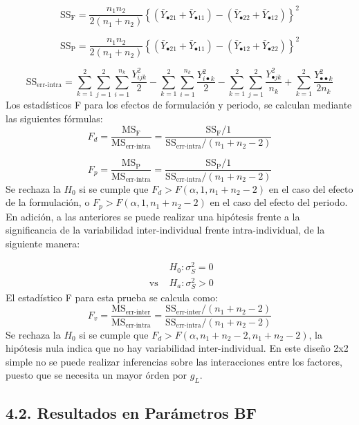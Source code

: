 \documentclass[]{article}
\begin{document}
\[
\textrm{SS}_{\textrm{F}}= 
\frac{n_{1}n_{2}}{2\left(n_{1}+n_{2}\right)} 
\left\{
\left(\bar{Y}_{\bullet 21}+\bar{Y}_{\bullet 11}\right)-
\left(\bar{Y}_{\bullet 22}+\bar{Y}_{\bullet 12}\right)
\right\}^{2}
\]

\[
\textrm{SS}_{\textrm{P}}= 
\frac{n_{1}n_{2}}{2\left(n_{1}+n_{2}\right)} 
\left\{
\left(\bar{Y}_{\bullet 21}+\bar{Y}_{\bullet 11}\right)-
\left(\bar{Y}_{\bullet 12}+\bar{Y}_{\bullet 22}\right)
\right\}^{2}
\]

\[
\textrm{SS}_{\textrm{err-intra}}=
\sum_{k=1}^{2}\sum_{j=1}^{2}\sum_{i=1}^{n_{k}}{\frac{Y_{ijk}^{2}}{2}}-
\sum_{k=1}^{2}\sum_{i=1}^{n_{k}}{\frac{Y_{i\bullet k}^{2}}{2}}-
\sum_{k=1}^{2}\sum_{j=1}^{2}{\frac{Y_{\bullet jk}^{2}}{n_{k}}}+
\sum_{k=1}^{2}{\frac{Y_{\bullet\bullet k}^{2}}{2n_{k}}}
\] Los estadísticos F para los efectos de formulación y periodo, se
calculan mediante las siguientes fórmulas:\\
\[
F_{d}=
\frac{\textrm{MS}_{\textrm{F}}}{\textrm{MS}_{\textrm{err-intra}}} = 
\frac{\textrm{SS}_{\textrm{F}}/1}{\textrm{SS}_{\textrm{err-intra}}/(n_{1}+n_{2}-2)}
\]

\[
F_{p}=
\frac{\textrm{MS}_{\textrm{P}}}{\textrm{MS}_{\textrm{err-intra}}} = 
\frac{\textrm{SS}_{\textrm{P}}/1}{\textrm{SS}_{\textrm{err-intra}}/(n_{1}+n_{2}-2)}
\] Se rechaza la \(H_{0}\) si se cumple que
\(F_{d} > F(\alpha,1,n_{1}+n_{2}-2)\) en el caso del efecto de la
formulación, o \(F_{p} > F(\alpha,1,n_{1}+n_{2}-2)\) en el caso del
efecto del periodo. En adición, a las anteriores se puede realizar una
hipótesis frente a la significancia de la variabilidad inter-individual
frente intra-individual, de la siguiente manera:

\[
\begin{aligned}
&H_{0}: \sigma_{S}^{2} = 0 \\
\textrm{ vs } &H_{a}: \sigma_{S}^{2} > 0 
\end{aligned}
\] El estadístico F para esta prueba se calcula como: \[
F_{v}=
\frac{\textrm{MS}_{\textrm{err-inter}}}{\textrm{MS}_{\textrm{err-intra}}} = 
\frac{\textrm{SS}_{\textrm{err-inter}}/(n_{1}+n_{2}-2)}{\textrm{SS}_{\textrm{err-intra}}/(n_{1}+n_{2}-2)}
\] Se rechaza la \(H_{0}\) si se cumple que
\(F_{d} > F(\alpha,n_{1}+n_{2}-2,n_{1}+n_{2}-2)\), la hipótesis nula
indica que no hay variabilidad inter-individual. En este diseño 2x2
simple no se puede realizar inferencias sobre las interacciones entre
los factores, puesto que se necesita un mayor órden por \(g_{L}\).

\subsection{4.2. Resultados en Parámetros
BF}\label{resultados-en-parametros-bf}
\end{document}
